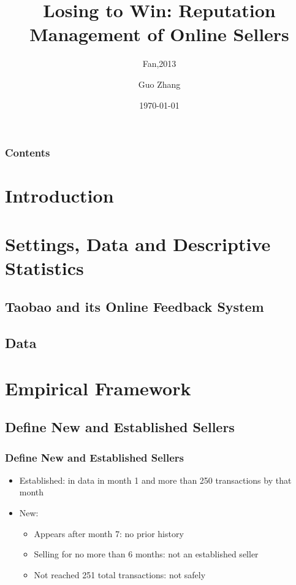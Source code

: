 \documentclass{beamer}
\title{Losing to Win: Reputation Management of Online Sellers}
\subtitle{Fan,2013}
\author{Guo Zhang}
\institute[Universities of]
{
WISE, Xiamen University
}
\date{\today}
\begin{document}
\begin{frame}[plain]
\titlepage
\end{frame}

\begin{frame}[plain] %
\frametitle{Contents}
\begin{multicols}{2}
  \tableofcontents
\end{multicols}
\end{frame}


\section{Introduction}
\begin{frame}
\frametitle{}
\end{frame}

\section{Settings, Data and Descriptive Statistics}
\subsection{Taobao and its Online Feedback System}
\subsection{Data}

\section{Empirical Framework}
\subsection{Define New and Established Sellers}
\begin{frame}
\frametitle{Define New and Established Sellers}
\begin{itemize}
\item Established: in data in month 1 and more than 250 transactions by that month
\item New:
\begin{itemize}
\item Appears after month 7: no prior history
\item Selling for no more than 6 months: not an established seller
\item Not reached 251 total transactions: not safely
\end{itemize}
\end{itemize}
\end{frame}
\end{document}
